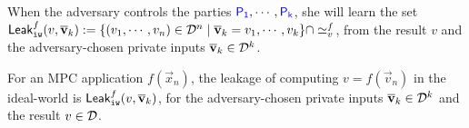 When the adversary controls the parties ${\textcolor{blue}{\sf P_{1}}},\cdots, {\textcolor{blue}{\sf P_{k}}}$,
she will learn the set  ${\sf Leak}_{\tt iw}^f(v,\overline{\bf{v}}_k): = \{(v_1,\cdots,v_n)\in\mathcal{D}^{n}\mid \overline{\bf{v}}_k=v_1,\cdots,v_k\}\cap \simeq_v^f$, %
from the result $v$ and the adversary-chosen private inputs $\overline{\bf{v}}_k\in\mathcal{D}^k$.


%
%



\begin{definition}\label{def:leakageinIdeal}
For an MPC application $f(\vec{x}_n)$, the leakage of computing
$v=f(\vec{v}_n)$ in the ideal-world is ${\sf Leak}_{\tt iw}^f(v,\overline{\bf{v}}_k)$,
for the adversary-chosen private inputs $\overline{\bf{v}}_k\in\mathcal{D}^k$  and the result $v\in \mathcal{D}$.
\end{definition}


